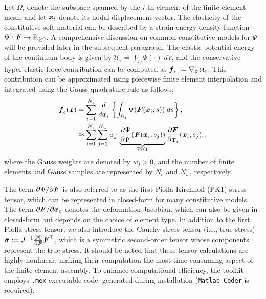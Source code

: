 \begin{intermez}
    
Let $\Omega_i$ denote the subspace spanned by the $i$-th element of the finite element mesh, and let ${\boldsymbol{x}}_i$ denote its nodal displacement vector. The elasticity of the constitutive soft material can be described by a strain-energy density function $\Psi: {\boldsymbol{F}} \to \mathbb{R}_{\ge 0}$. A comprehensive discussion on common constitutive models for $\Psi$ will be provided later in the subsequent paragraph. The elastic potential energy of the continuum body is given by $\mathcal{U}_e = \int_\Omega \Psi(\cdot) \; dV$, and the conservative hyper-elastic force contribution can be computed as ${\boldsymbol{f}}_e := \nabla_{{\boldsymbol{x}}}\,\mathcal{U}_e$. This contribution can be approximated using piecewise finite element interpolation and integrated using the Gauss quadrature rule \cite{Kim2018} as follows:
    \begin{align}
        {\boldsymbol{f}}_\textrm{e}({\boldsymbol{x}}) & = \sum_{i=1}^{N_e} \frac{d}{d{\boldsymbol{x}}_i} \left\{\int_{\Omega_i} \Psi({\boldsymbol{F}}({\boldsymbol{x}}_i,s)) \; ds\right\}, \notag                                                    \\
                           & \approx \sum_{i=1}^{N_e} \sum_{j=1}^{N_w} w_j \, \underbrace{\frac{\partial \Psi}{\partial {\boldsymbol{F}}}({\boldsymbol{F}}({\boldsymbol{x}}_i,s_j)) }_{\textrm{PK1}} \frac{\partial {\boldsymbol{F}}}{\partial {\boldsymbol{x}}_i}({\boldsymbol{x}}_i,s_j),.
        \label{eq:C5:fem_hyper}
    \end{align}
where the Gauss weights are denoted by $w_j > 0$, and the number of finite elements and Gauss samples are represented by $N_e$ and $N_w$, respectively.

The term ${\partial \Psi}/{\partial {\boldsymbol{F}}}$ is also referred to as the first Piolla-Kirchhoff (PK1) stress tensor, which can be represented in closed-form for many constitutive models. The term ${\partial {\boldsymbol{F}}}/{\partial {\boldsymbol{x}}_e}$ denotes the deformation Jacobian, which can also be given in closed-form but depends on the choice of element type. In addition to the first Piolla stress tensor, we also introduce the Cauchy stress tensor (i.e., true stress) $\boldsymbol{\sigma} := J^{-1} \frac{\partial \Psi}{\partial {\boldsymbol{F}}} {\boldsymbol{F}}^\top$, which is a symmetric second-order tensor whose components represent the true stress. It should be noted that these tensor calculations are highly nonlinear, making their computation the most time-consuming aspect of the finite element assembly. To enhance computational efficiency, the toolkit employs \texttt{.mex} executable code, generated during installation (\texttt{Matlab Coder} is required).
\end{intermez}

